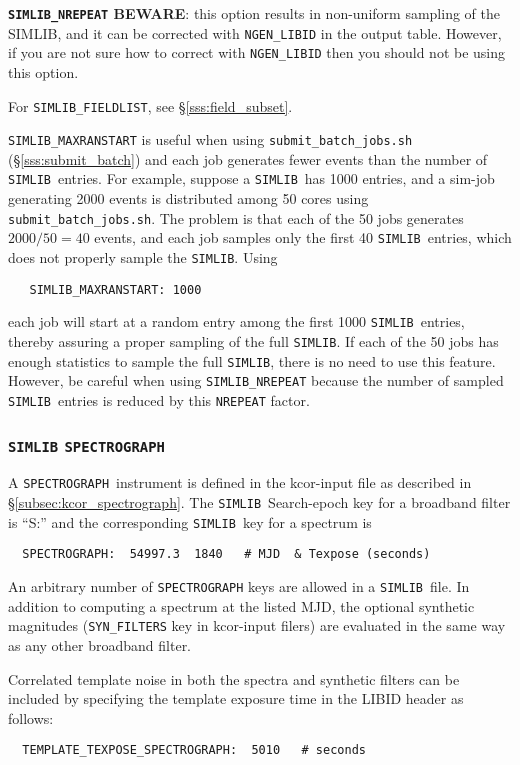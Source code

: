 \documentclass[12pt]{article}
\newcommand{\SPEC}{{\tt SPECTROGRAPH}}
\newcommand{\simlib}{{\tt SIMLIB}}
\newcommand{\submit}{\tt submit\_batch\_jobs.sh}
\begin{document}
{{\bf {\tt SIMLIB\_NREPEAT} BEWARE}: this option results in non-uniform
sampling of the SIMLIB, and it can be corrected with {\tt NGEN\_LIBID}
in the output table. However, if you are not sure how to correct 
with {\tt NGEN\_LIBID} then you should not be using this option.

\medskip
For {\tt SIMLIB\_FIELDLIST}, see  \S\ref{sss:field_subset}.


\bigskip
{\tt SIMLIB\_MAXRANSTART} is useful when using {\submit}
(\S\ref{sss:submit_batch}) and each job generates fewer events than
the number of \simlib\ entries. For example, suppose a \simlib\ has 
1000 entries, and a sim-job generating 2000 events
is distributed among 50 cores using {\submit}. 
The problem is that each of the 50 jobs generates $2000/50=40$ events, 
and each job samples only the first 40 \simlib\ entries, 
which does not properly sample the \simlib. Using
\begin{verbatim}
   SIMLIB_MAXRANSTART: 1000
\end{verbatim}
%
each job will start at a random entry among the
first 1000 \simlib\ entries, thereby assuring a
proper sampling of the full \simlib.
If each of the 50 jobs has enough statistics to sample
the full \simlib, there is no need to use this feature.
However, be careful when using  {\tt SIMLIB\_NREPEAT}
because the number of sampled \simlib\ entries is reduced
by this {\tt NREPEAT} factor.

\subsubsection{{\simlib} \SPEC\ }
\label{sssec:simlib_spectrograph}

A \SPEC\ instrument is defined in the kcor-input file 
as described in \S\ref{subsec:kcor_spectrograph}.
The \simlib\ Search-epoch key for a broadband filter is ``S:''
and the corresponding \simlib\ key for a spectrum is
%
\begin{verbatim}
  SPECTROGRAPH:  54997.3  1840   # MJD  & Texpose (seconds)
\end{verbatim}
An arbitrary number of {\SPEC} keys are allowed in a \simlib\ file.
In addition to computing a spectrum at the listed MJD,
the optional synthetic magnitudes ({\tt SYN\_FILTERS} key
in kcor-input filers) are evaluated in the same way
as any other broadband filter. 

Correlated template noise in both the spectra and synthetic filters
can be included by specifying the template exposure time in the 
LIBID header as follows:
\begin{verbatim}
  TEMPLATE_TEXPOSE_SPECTROGRAPH:  5010   # seconds
\end{verbatim}
%

}
\end{document}

